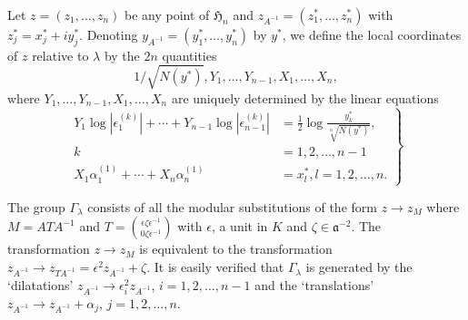 Let $z=(z_{1},\ldots,z_{n})$ be any point of $\mathfrak{H}_{n}$ and
$z_{A^{-1}}=(z^{\ast}_{1},\ldots,z^{\ast}_{n})$ with
$z^{\ast}_{j}=x^{\ast}_{j}+iy^{\ast}_{j}$. Denoting
$y_{A^{-1}}=(y^{\ast}_{1},\ldots,y^{\ast}_{n})$ by $y^{\ast}$, we
define the local coordinates of $z$ relative to $\lambda$ by the $2n$
quantities
$$
1/\sqrt{N(y^{\ast})}, Y_{1},\ldots,Y_{n-1},X_{1},\ldots,X_{n},
$$
where $Y_{1},\ldots,Y_{n-1},X_{1},\ldots,X_{n}$ are uniquely
determined by the linear equations
\begin{equation*}
\left.
\begin{aligned}
Y_{1}\log
|\epsilon^{(k)}_{1}|+\cdots+Y_{n-1}\log|\epsilon^{(k)}_{n-1}| &=
\frac{1}{2}\log\frac{y^{\ast}_{k}}{\sqrt[n]{N(y^{\ast})}},\\
k &= 1,2,\ldots,n-1\\
X_{1}\alpha^{(1)}_{1}+\cdots+X_{n}\alpha^{(1)}_{n} &= x^{\ast}_{l},
l=1,2,\ldots, n.
\end{aligned}
\right\}\tag{147}\label{147}
\end{equation*}

The group $\Gamma_{\lambda}$ consists of all the modular substitutions
of the form $z\to z_{M}$ where $M=ATA^{-1}$ and
$T=\binom{\epsilon\zeta\epsilon^{-1}}{0\zeta\epsilon^{-1}}$ with
$\epsilon$, a unit in $K$ and $\zeta\in \mathfrak{a}^{-2}$. The
transformation $z\to z_{M}$ is equivalent to the transformation
$z_{A^{-1}}\to z_{TA^{-1}}=\epsilon^{2}z_{A^{-1}}+\zeta$. It is easily
verified that $\Gamma_{\lambda}$ is generated by the `dilatations'
$z_{A^{-1}}\to \epsilon^{2}_{i}z_{A^{-1}}$, $i=1,2,\ldots,n-1$ and the
`translations' $z_{A^{-1}}\to z_{A^{-1}}+\alpha_{j}$,
$j=1,2,\ldots,n$.

